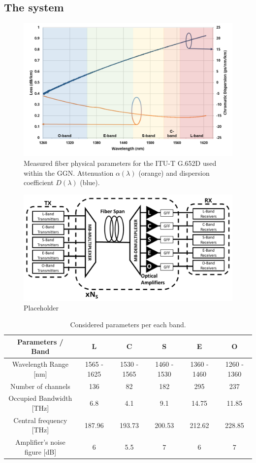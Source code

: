 \documentclass[journal]{IEEEtran}
\begin{document}
\subsection{The system}
%
\begin{figure}[!htb]
\center
\includegraphics[width=1\linewidth]{Figures/Sec_III/fiber_parameters.png}
\caption{Measured fiber physical parameters for the ITU-T G.652D used within the GGN. Attenuation $\alpha(\lambda)$ (orange) and dispersion coefficient $D(\lambda)$ (blue).}
\label{fig:system}
\end{figure}
%
\begin{figure}[!htb]
\center
\includegraphics[width=0.5\linewidth]{Figures/Sec_III/physical_layout_v2}
\caption{Placeholder}
\label{fig:system}
\end{figure}
%
\begin{table}[t]
    \centering \caption{Considered parameters per each band.}
    \label{tab:params}
    \begin{tabular}{c|ccccc}
        \hline
        Parameters / Band & L & C & S & E & O \\
        \hline 
        Wavelength Range [nm] & 1565 - 1625 & 1530 - 1565 & 1460 - 1530 & 1360 - 1460 & 1260 - 1360 \\
        Number of channels & 136 & 82 & 182 & 295 & 237 \\
        Occupied Bandwidth [THz] & 6.8 & 4.1 & 9.1 & 14.75 & 11.85\\
        Central frequency [THz] & 187.96 & 193.73 & 200.53 & 212.62 &
        228.85 \\
        Amplifier's noise figure [dB] & 6 & 5.5 & 7 & 6 & 7 \\
        \hline
    \end{tabular}
    \label{tab:data}
\end{table}
%
\end{document}
